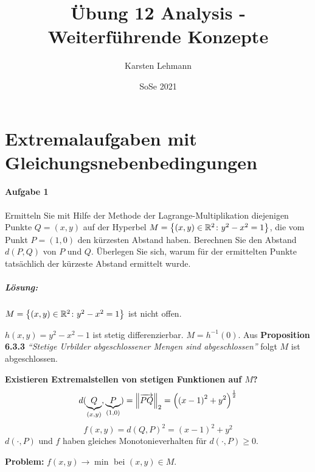 \documentclass{scrreprt}
\author{Karsten Lehmann}
\date{SoSe 2021}
\title{Übung 12 Analysis - Weiterführende Konzepte}
\begin{document}
\setcounter{chapter}{1}
\section*{Extremalaufgaben mit Gleichungsnebenbedingungen}

\paragraph{Aufgabe 1} Ermitteln Sie mit Hilfe der Methode der
Lagrange-Multiplikation diejenigen Punkte $Q = (x, y)$ auf der Hyperbel
$M = \qty{(x, y) \in \mathbb{R}^2 \colon y^2 - x^2 = 1}$, die vom Punkt
$P = (1, 0)$ den kürzesten Abstand haben.
Berechnen Sie den Abstand $d(P, Q)$ von $P$ und $Q$.
Überlegen Sie sich, warum für der ermittelten Punkte tatsächlich der
kürzeste Abstand ermittelt wurde.

\subparagraph{Lösung:} $M = \qty{(x, y) \in \mathbb{R}^2 \colon y^2 - x^2 = 1}$
ist nicht offen.
\begin{center}
\end{center}
$h(x, y) = y^2 - x^2 - 1$ ist stetig differenzierbar.
$M = h^{-1} ({0})$. Aus \textbf{Proposition 6.3.3}
\textit{``Stetige Urbilder abgeschlossener Mengen sind abgeschlossen''} folgt
$M$ ist abgeschlossen.

\textbf{Existieren Extremalstellen von stetigen Funktionen auf $M$?}
\[
  d(\underset{(x, y)}{\underbrace{Q}}, \underset{(1, 0)}{\underbrace{P}})
  = \norm{\overrightarrow{PQ}}_2
  = \qty\Big(\qty(x - 1)^2 + y^2)^{\frac{1}{2}}
\]
\[
  f(x, y) = d(Q, P)^2 = (x - 1)^2 + y^2
\]
$d(\cdot, P)$ und $f$ haben gleiches Monotonieverhalten für $d(\cdot, P) \geq 0$.

\textbf{Problem:} $f(x, y) \longrightarrow \min$ bei $(x, y) \in M$.
\end{document}
